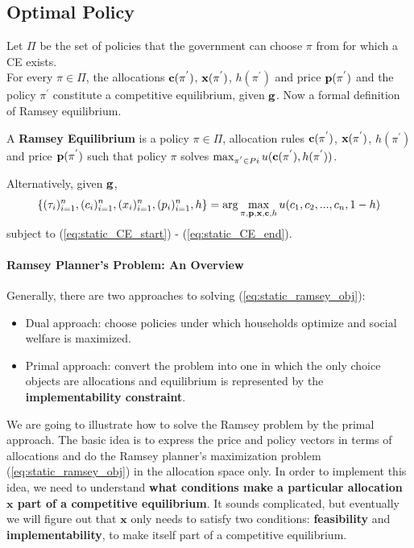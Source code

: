 \documentclass[12pt]{article}
\begin{document}
	
	\subsection{Optimal Policy}
	Let $\Pi$ be the set of policies that the government can choose $\pi$ from for which a CE exists.\\
	For every $\pi \in \Pi$, the allocations $\bold{c}(\pi^{'})$, $\bold{x}(\pi^{'})$, $h(\pi^{'})$ and price $\bold{p}(\pi^{'})$ and the policy $\pi^{'}$ constitute a competitive equilibrium, given $\bold{g}$.
	Now a formal definition of Ramsey equilibrium.
	\begin{definition}
		A \textbf{Ramsey Equilibrium} is a policy $\pi \in \Pi$, allocation rules $\bold{c}(\pi^{'})$, $\bold{x}(\pi^{'})$, $h(\pi^{'})$ and price $\bold{p}(\pi^{'})$ such that policy $\pi$ solves $\max_{\pi^{'}\in Pi}u(\bold{c}(\pi^{'}), h(\pi^{'}))$.
	\end{definition}
	
	\noindent
	Alternatively, given $\bold{g}$,
	\begin{equation} \label{eq:static_ramsey_obj}
		\{(\tau_i)_{i=1}^n, (c_i)_{i=1}^n, (x_i)_{i=1}^n, (p_i)_{i=1}^n, h\} = \arg \max_{\pi, \bold{p}, \bold{x}, \bold{c}, h} u(c_1, c_2, ..., c_n, 1-h)
	\end{equation}
	subject to (\ref{eq:static_CE_start}) - (\ref{eq:static_CE_end}).
	
	\paragraph{Ramsey Planner's Problem: An Overview}
		Generally, there are two approaches to solving (\ref{eq:static_ramsey_obj}):
	\begin{itemize}
			\item Dual approach: choose policies under which households optimize and social welfare is maximized.
			\item Primal approach: convert the problem into one in which the only choice objects are allocations and equilibrium is represented by the \textbf{implementability constraint}.
	\end{itemize}
	We are going to illustrate how to solve the Ramsey problem by the primal approach. The basic idea is to express the price and policy vectors in terms of allocations and do the Ramsey planner's maximization problem (\ref{eq:static_ramsey_obj}) in the allocation space only. In order to implement this idea, we need to understand \textbf{what conditions make a particular allocation $\mathbf{x}$ part of a competitive equilibrium}. It sounds complicated, but eventually we will figure out that $\mathbf{x}$ only needs to satisfy two conditions: \textbf{feasibility} and \textbf{implementability}, to make itself part of a competitive equilibrium.
	
\end{document}
